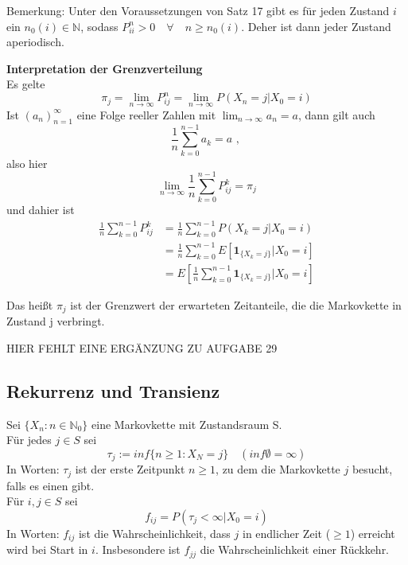 \documentclass[a4paper,12pt]{article}
\begin{document}
Bemerkung: Unter den Voraussetzungen von Satz 17 gibt es für jeden Zustand $i$ ein $n_0(i) \in \mathbb{N}$,
sodass $P_{ii}^n > 0 \quad \forall \quad n \geq n_0(i)$. Deher ist dann jeder Zustand aperiodisch.


\textbf{Interpretation der Grenzverteilung}\\
Es gelte
$$
	\pi_j = \lim_{n \to \infty}P_{ij}^n = \lim_{n \to \infty}P(X_n = j | X_0 =i)
$$
Ist $(a_n)_{n=1}^\infty$ eine Folge reeller Zahlen mit $\lim_{n \to \infty}a_n = a$, dann gilt auch
$$
	\frac{1}{n}\sum_{k=0}^{n-1}a_k = a \text{ , }
$$
also hier
$$
	\lim_{n \to \infty} \frac{1}{n} \sum_{k=0}^{n-1}P_{ij}^k = \pi_j
$$
und dahier ist
\begin{align*}
	\frac{1}{n}\sum_{k=0}^{n-1}P_{ij}^k & = \frac{1}{n}\sum_{k=0}^{n-1}P(X_k = j | X_0 =i)                                             \\
	                                    & = \frac{1}{n}\sum_{k=0}^{n-1} E \left[\textbf{1}_{\{X_k = j\}}|X_0 = i\right]                \\
	                                    & = E \left[\frac{1}{n}\sum_{k=0}^{n-1}  \textbf{1}_{\{X_k = j\}} | X_0 =i             \right]
\end{align*}

Das heißt $\pi_j$ ist der Grenzwert der erwarteten Zeitanteile, die die Markovkette in Zustand j verbringt.



\begin{tcolorbox}[breakable, colframe=blue, colback=white, title=Beispiel 14]
	HIER FEHLT EINE ERGÄNZUNG ZU AUFGABE 29
\end{tcolorbox}


\subsection{Rekurrenz und Transienz}
Sei $\{X_n: n \in \mathbb{N}_0\}$ eine Markovkette mit Zustandsraum S.\\
Für jedes $j \in S$ sei
$$
	\tau_j := inf\{n  \geq 1: X_N = j\} \quad (inf \emptyset = \infty)
$$
In Worten: $\tau_j$ ist der erste Zeitpunkt $n \geq 1$, zu dem die Markovkette $j$ besucht, falls es einen gibt.\\
Für $i,j \in S$ sei
$$
	f_{ij} = P(\tau_j < \infty | X_0 = i)
$$
In Worten: $f_{ij}$ ist die Wahrscheinlichkeit, dass $j$ in endlicher Zeit ($\geq 1$) erreicht wird bei Start in $i$.
Insbesondere ist $f_{jj}$ die Wahrscheinlichkeit einer Rückkehr.\\
\end{document}
